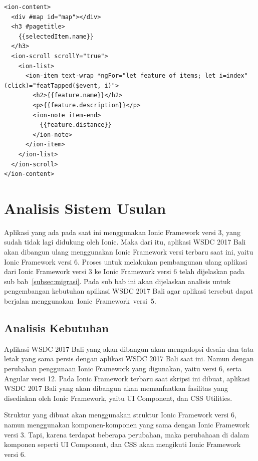 \begin{enumerate}
\begin{itemize}
\begin{lstlisting}[label={lst:contentVenuesMap}, caption=\textit{Content} pada venues\textunderscore map.html]
<ion-content>
  <div #map id="map"></div>
  <h3 #pagetitle>
    {{selectedItem.name}}
  </h3>
  <ion-scroll scrollY="true">
    <ion-list>
      <ion-item text-wrap *ngFor="let feature of items; let i=index" (click)="featTapped($event, i)">
        <h2>{{feature.name}}</h2>
        <p>{{feature.description}}</p>
        <ion-note item-end>
          {{feature.distance}}
        </ion-note>
      </ion-item>
    </ion-list>
  </ion-scroll>
</ion-content>
\end{lstlisting}

	\end{itemize}
\end{enumerate}

\section{Analisis Sistem Usulan}
\label{sec:analisisSistemUsulan}

Aplikasi yang ada pada saat ini menggunakan Ionic Framework versi 3, yang sudah tidak lagi didukung oleh Ionic. Maka dari itu, aplikasi WSDC 2017 Bali akan dibangun ulang  menggunakan Ionic Framework versi terbaru saat ini, yaitu Ionic Framework versi 6. Proses untuk melakukan pembangunan ulang aplikasi dari Ionic Framework versi 3 ke Ionic Framework versi 6 telah dijelaskan pada sub bab~\ref{subsec:migrasi}. Pada sub bab ini akan dijelaskan analisis untuk pengembangan kebutuhan apilkasi WSDC 2017 Bali agar aplikasi tersebut dapat berjalan menggunakan~Ionic~Framework~versi~5.

\subsection{Analisis Kebutuhan}
\label{sec:analisisKebutuhanSistem}
Aplikasi WSDC 2017 Bali yang akan dibangun akan mengadopsi desain dan tata letak yang sama persis dengan aplikasi WSDC 2017 Bali saat ini. Namun dengan perubahan penggunaan Ionic Framework yang digunakan, yaitu versi 6, serta Angular versi 12. Pada Ionic Framework terbaru saat skripsi ini dibuat, aplikasi WSDC 2017 Bali yang akan dibangun akan memanfaatkan fasilitas yang disediakan oleh Ionic Framework, yaitu UI Component, dan CSS Utilities. 

Struktur yang dibuat akan menggunakan struktur Ionic Framework versi 6, namun menggunakan komponen-komponen yang sama dengan Ionic Framework versi 3. Tapi, karena terdapat beberapa perubahan, maka perubahaan di dalam komponen seperti UI Component, dan CSS akan mengikuti Ionic Framework versi 6. 

